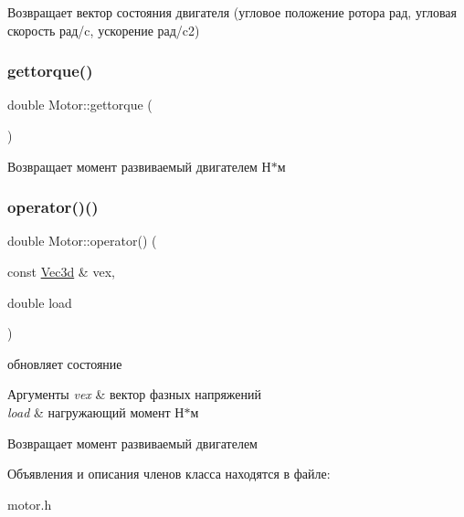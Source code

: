 \begin{DoxyReturn}{Возвращает}
вектор состояния двигателя (угловое положение ротора рад, угловая скорость рад/c, ускорение рад/c2) 
\end{DoxyReturn}
\mbox{\label{classMotor_ac14e02e5c16a5ffe35815fe2bf586fbe}} 
\subsubsection{\texorpdfstring{gettorque()}{gettorque()}}
{\footnotesize\ttfamily double Motor\+::gettorque (\begin{DoxyParamCaption}{ }\end{DoxyParamCaption})\hspace{0.3cm}{\ttfamily [inline]}}

\begin{DoxyReturn}{Возвращает}
момент развиваемый двигателем Н$\ast$м 
\end{DoxyReturn}
\mbox{\label{classMotor_a30091b07e2c1aa8d85047f84e3137c79}} 
\subsubsection{\texorpdfstring{operator()()}{operator()()}}
{\footnotesize\ttfamily double Motor\+::operator() (\begin{DoxyParamCaption}\item[{const \hyperlink{structVec3}{Vec3d} \&}]{vex,  }\item[{double}]{load }\end{DoxyParamCaption})\hspace{0.3cm}{\ttfamily [inline]}}



обновляет состояние 


\begin{DoxyParams}{Аргументы}
{\em vex} & вектор фазных напряжений \\
\hline
{\em load} & нагружающий момент Н$\ast$м \\
\hline
\end{DoxyParams}
\begin{DoxyReturn}{Возвращает}
момент развиваемый двигателем 
\end{DoxyReturn}


Объявления и описания членов класса находятся в файле\+:\begin{DoxyCompactItemize}
\item 
motor.\+h\end{DoxyCompactItemize}
